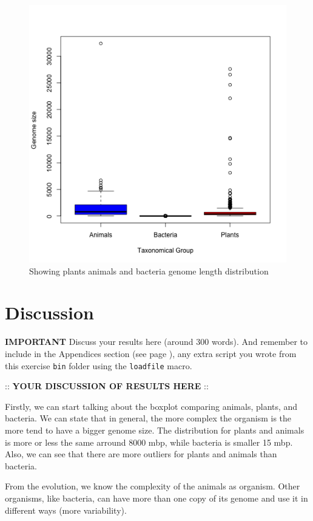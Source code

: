 \documentclass[10pt,a4paper,]{article}
\begin{document}
\begin{figure}
\centering
\includegraphics{images/merge.png}
\caption{Showing plants animals and bacteria genome length distribution}
\end{figure}

\hypertarget{discussion}{%
\section{Discussion}\label{discussion}}

\label{sec:discussion}

\textbf{IMPORTANT} Discuss your results here (around 300 words). And
remember to include in the Appendices section (see page
\pageref{sec:appendices}), any extra script you wrote from this exercise
\texttt{bin} folder using the \texttt{loadfile} macro.

:: \textbf{YOUR DISCUSSION OF RESULTS HERE} ::

Firstly, we can start talking about the boxplot comparing animals,
plants, and bacteria. We can state that in general, the more complex the
organism is the more tend to have a bigger genome size. The distribution
for plants and animals is more or less the same arround 8000 mbp, while
bacteria is smaller 15 mbp. Also, we can see that there are more
outliers for plants and animals than bacteria.

From the evolution, we know the complexity of the animals as organism.
Other organisms, like bacteria, can have more than one copy of its
genome and use it in different ways (more variability).
\end{document}
